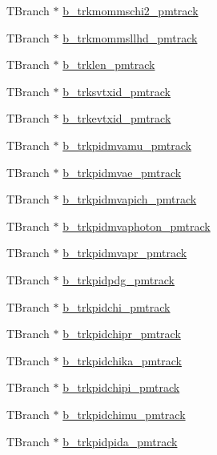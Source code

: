 \begin{DoxyCompactItemize}
\item 
T\-Branch $\ast$ \hyperlink{classanatree_a60916370f2dddc226c224b1dbf02db0c}{b\-\_\-trkmommschi2\-\_\-pmtrack}
\item 
T\-Branch $\ast$ \hyperlink{classanatree_ab37a745d92d64a057ed964899a67b997}{b\-\_\-trkmommsllhd\-\_\-pmtrack}
\item 
T\-Branch $\ast$ \hyperlink{classanatree_ab493ed3597b226713def0475341d90d6}{b\-\_\-trklen\-\_\-pmtrack}
\item 
T\-Branch $\ast$ \hyperlink{classanatree_a196d28fbde8ad3263faf45b8c85117b3}{b\-\_\-trksvtxid\-\_\-pmtrack}
\item 
T\-Branch $\ast$ \hyperlink{classanatree_a1c0be1bb5c6c26c7024191b1c3653024}{b\-\_\-trkevtxid\-\_\-pmtrack}
\item 
T\-Branch $\ast$ \hyperlink{classanatree_a6fd89f379642a84d1aa4505375b74843}{b\-\_\-trkpidmvamu\-\_\-pmtrack}
\item 
T\-Branch $\ast$ \hyperlink{classanatree_a9d73fd296b3092ca78be2916f09e3c8f}{b\-\_\-trkpidmvae\-\_\-pmtrack}
\item 
T\-Branch $\ast$ \hyperlink{classanatree_af35237898d9339ee414e664675dad0b0}{b\-\_\-trkpidmvapich\-\_\-pmtrack}
\item 
T\-Branch $\ast$ \hyperlink{classanatree_a9e287ce9f79dc9a466e23f2446a909dc}{b\-\_\-trkpidmvaphoton\-\_\-pmtrack}
\item 
T\-Branch $\ast$ \hyperlink{classanatree_a0f3cd50b87a9523f96bcf868642777e0}{b\-\_\-trkpidmvapr\-\_\-pmtrack}
\item 
T\-Branch $\ast$ \hyperlink{classanatree_ada61c30b08638269d869939c011ddca9}{b\-\_\-trkpidpdg\-\_\-pmtrack}
\item 
T\-Branch $\ast$ \hyperlink{classanatree_afd1720b1884e1de63b86b3424b3d3bdc}{b\-\_\-trkpidchi\-\_\-pmtrack}
\item 
T\-Branch $\ast$ \hyperlink{classanatree_a0c87e9cc9c6e339d60baed587df0db61}{b\-\_\-trkpidchipr\-\_\-pmtrack}
\item 
T\-Branch $\ast$ \hyperlink{classanatree_a47a5da30cd975206c3255d43a4c77c3a}{b\-\_\-trkpidchika\-\_\-pmtrack}
\item 
T\-Branch $\ast$ \hyperlink{classanatree_a1b78928cede5261d5aad7f4954b25ca1}{b\-\_\-trkpidchipi\-\_\-pmtrack}
\item 
T\-Branch $\ast$ \hyperlink{classanatree_a093ac3df7a027f6fa3ccb1d1bf1f1a96}{b\-\_\-trkpidchimu\-\_\-pmtrack}
\item 
T\-Branch $\ast$ \hyperlink{classanatree_ae5b0e3947ef8c6150ef24991f7c0328c}{b\-\_\-trkpidpida\-\_\-pmtrack}

\end{DoxyCompactItemize}
